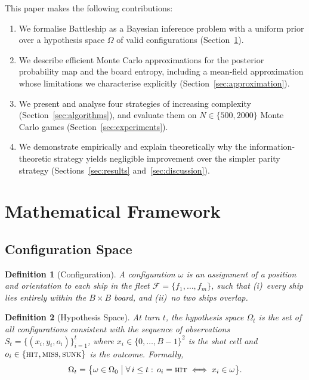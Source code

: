 \documentclass[12pt,a4paper]{article}
\newtheorem{definition}{Definition}
\newcommand{\1}{\mathbf{1}}
\begin{document}
This paper makes the following contributions:
\begin{enumerate}[nosep]
  \item We formalise Battleship as a Bayesian inference problem with a uniform
        prior over a hypothesis space $\Omega$ of valid configurations
        (Section~\ref{sec:framework}).
  \item We describe efficient Monte Carlo approximations for the posterior
        probability map and the board entropy, including a mean-field
        approximation whose limitations we characterise explicitly
        (Section~\ref{sec:approximation}).
  \item We present and analyse four strategies of increasing complexity
        (Section~\ref{sec:algorithms}), and evaluate them on $N \in
        \{500, 2000\}$ Monte Carlo games (Section~\ref{sec:experiments}).
  \item We demonstrate empirically and explain theoretically why the
        information-theoretic strategy yields negligible improvement over the
        simpler parity strategy (Sections~\ref{sec:results}
        and~\ref{sec:discussion}).
\end{enumerate}

\section{Mathematical Framework}
\label{sec:framework}

\subsection{Configuration Space}

\begin{definition}[Configuration]
  A \emph{configuration} $\omega$ is an assignment of a position and orientation
  to each ship in the fleet $\mathcal{F} = \{f_1, \ldots, f_m\}$, such that
  (i)~every ship lies entirely within the $B\times B$ board, and
  (ii)~no two ships overlap.
\end{definition}

\begin{definition}[Hypothesis Space]
  At turn $t$, the \emph{hypothesis space} $\Omega_t$ is the set of all
  configurations consistent with the sequence of observations $S_t = \{(x_i,
  y_i, o_i)\}_{i=1}^{t}$, where $x_i \in \{0,\ldots,B-1\}^2$ is the shot
  cell and $o_i \in \{\textsc{hit}, \textsc{miss}, \textsc{sunk}\}$ is the
  outcome.  Formally,
  \begin{equation}
    \Omega_t = \bigl\{\omega \in \Omega_0 \;\big|\;
      \forall\, i \le t:\, o_i = \textsc{hit} \iff x_i \in \omega \bigr\}.
  \end{equation}
\end{definition}
\end{document}
